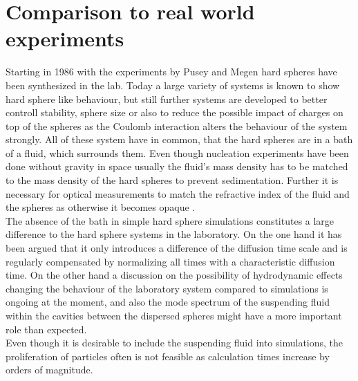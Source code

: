 \section{Comparison to real world experiments} 
\label{sec:comparison}

Starting in 1986 with the experiments by Pusey and Megen \cite{Pusey1986} hard spheres have been synthesized in the lab. Today a large variety of systems is known to show hard sphere like behaviour, but still further systems are developed to better controll stability, sphere size or also to reduce the possible impact of charges on top of the spheres as the Coulomb interaction alters the behaviour of the system strongly. All of these system have in common, that the hard spheres are in a bath of a fluid, which surrounds them. Even though nucleation experiments have been done without gravity in space\cite{Doherty1998} usually the fluid's mass density has to be matched to the mass density of the hard spheres to prevent sedimentation. Further it is necessary for optical measurements to match the refractive index of the fluid and the spheres as otherwise it becomes opaque .\\

The absence of the bath in simple hard sphere simulations constitutes a large difference to the hard sphere systems in the laboratory. On the one hand it has been argued that it only introduces a difference of the diffusion time scale and is regularly compensated by normalizing all times with a characteristic diffusion time. On the other hand a discussion on the possibility of hydrodynamic effects changing the behaviour of the laboratory system compared to simulations is ongoing at the moment, and also the mode spectrum of the suspending fluid within the cavities between the dispersed spheres might have a more important role 
than expected.\\ 
Even though it is desirable to include the suspending fluid into simulations, the proliferation of particles often is not feasible as calculation times increase by orders of magnitude.\\

